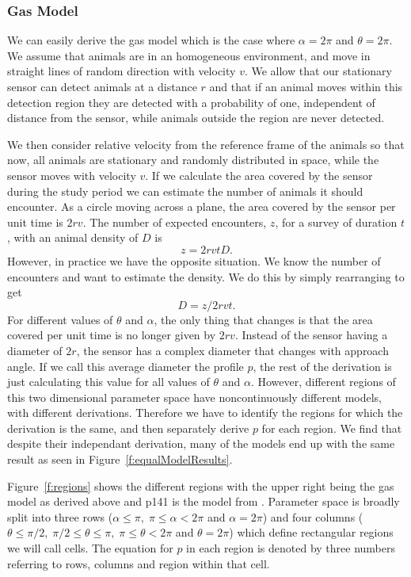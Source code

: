 \documentclass[a4paper,10pt,reqno,oneside]{amsart}
\begin{document}
\subsubsection{Gas Model}

We can easily derive the gas model which is the case where $ \alpha =  2\pi$ and $ \theta =  2\pi$. We assume that animals are in an homogeneous environment, and move in straight lines of random direction with velocity $v$. We allow that our stationary sensor can detect animals at a distance $r$ and that if an animal moves within this detection region they are detected with a probability of one, independent of distance from the sensor, while animals outside the region are never detected.

We then consider relative velocity from the reference frame of the animals so that now, all animals are stationary and randomly distributed in space, while the sensor moves with velocity $v$. If we calculate the area covered by the sensor during the study period we can estimate the number of animals it should encounter. As a circle moving across a plane, the area covered by the sensor per unit time is $2rv$. The number of expected encounters, $z$, for a survey of duration $t$, with an animal density of $D$ is
\begin{equation}
	z = 2rvtD.
\end{equation}
However, in practice we have the opposite situation. We know the number of encounters and want to estimate the density. We do this by simply rearranging to get
\begin{equation}
	D = z/2rvt.
\end{equation}
For different values of $\theta$ and $\alpha$, the only thing that changes is that the area covered per unit time is no longer given by $2rv$. Instead of the sensor having a diameter of $2r$, the sensor has a complex diameter that changes with approach angle. If we call this average diameter the profile $p$, the rest of the derivation is just calculating this value for all values of $\theta$ and $\alpha$. However, different regions of this two dimensional parameter space have noncontinuously different models, with different derivations. Therefore we have to identify the regions for which the derivation is the same, and then separately derive $p$ for each region. We find that despite their independant derivation, many of the models end up with the same result as seen in Figure~\ref{f:equalModelResults}.


Figure~\ref{f:regions} shows the different regions with the upper right being the gas model as derived above and p141 is the model from \cite{rowcliffe2008estimating}. Parameter space is broadly split into three rows ($ \alpha \le \pi,\; \pi \le \alpha < 2\pi$ and $ \alpha = 2\pi$) and four columns ($ \theta \le \pi/2,\;  \pi/2 \le \theta \le  \pi,\;  \pi \le \theta < 2\pi$ and $\theta = 2\pi$) which define rectangular regions we will call cells. The equation for $p$ in each region is denoted by three numbers referring to rows, columns and region within that cell. 
\end{document}
